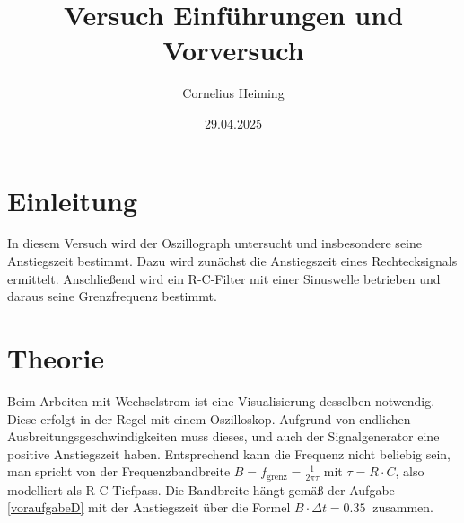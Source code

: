 \documentclass[ngerman]{scrartcl}
\author{Cornelius Heiming}
\title{Versuch \nummer\:  Einf\"uhrungen und Vorversuch}
\date{29.04.2025}
\theoremstyle{definition}
\begin{document}
	\maketitle
	\section{Einleitung}
		In diesem Versuch wird der Oszillograph untersucht und insbesondere seine Anstiegszeit bestimmt. Dazu wird zunächst die Anstiegszeit eines Rechtecksignals ermittelt. Anschließend wird ein R-C-Filter mit einer Sinuswelle betrieben und daraus seine Grenzfrequenz bestimmt. 
	\section{Theorie}

		Beim Arbeiten mit Wechselstrom ist eine Visualisierung desselben notwendig. Diese erfolgt in der Regel mit einem Oszilloskop. Aufgrund von endlichen Ausbreitungsgeschwindigkeiten muss dieses, und auch der Signalgenerator eine positive Anstiegszeit haben. Entsprechend kann die Frequenz nicht beliebig sein, man spricht von der Frequenzbandbreite $B = f_\mathrm{grenz} = \frac{1}{2\pi \tau}$ mit $\tau = R \cdot C$, also modelliert als R-C Tiefpass. Die Bandbreite hängt gemäß der Aufgabe \ref{voraufgabeD} mit der Anstiegszeit über die Formel $B \cdot \Delta t = \SI{0,35}{}$ zusammen.
\end{document}
